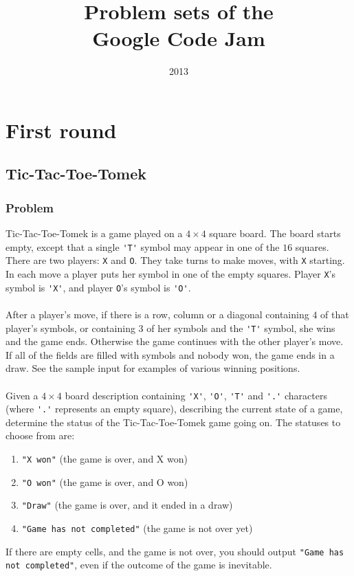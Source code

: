 \documentclass[titlepage]{article}
\title{Problem sets of the\\Google Code Jam}
\author{}
\date{2013}
\begin{document}
\begin{titlepage}
\maketitle
\end{titlepage}
\tableofcontents
\newpage

\section{First round}

\subsection{Tic-Tac-Toe-Tomek}

\subsubsection{Problem}
Tic-Tac-Toe-Tomek is a game played on a $4\times4$ square board. The board starts empty, except that a single \verb+'T'+ symbol may appear in one of the $16$ squares. There are two players: \verb+X+ and \verb+O+. They take turns to make moves, with \verb+X+ starting. In each move a player puts her symbol in one of the empty squares. Player \verb+X+'s symbol is \verb+'X'+, and player \verb+O+'s symbol is \verb+'O'+.
\paragraph{}
After a player's move, if there is a row, column or a diagonal containing $4$ of that player's symbols, or containing $3$ of her symbols and the \verb+'T'+ symbol, she wins and the game ends. Otherwise the game continues with the other player's move. If all of the fields are filled with symbols and nobody won, the game ends in a draw. See the sample input for examples of various winning positions.
\paragraph{}
Given a $4\times4$ board description containing \verb+'X'+, \verb+'O'+, \verb+'T'+ and \verb+'.'+ characters (where \verb+'.'+ represents an empty square), describing the current state of a game, determine the status of the Tic-Tac-Toe-Tomek game going on. The statuses to choose from are:
\begin{enumerate}
 \item \verb+"X won"+ (the game is over, and X won)
 \item \verb+"O won"+ (the game is over, and O won)
 \item \verb+"Draw"+ (the game is over, and it ended in a draw)
 \item \verb+"Game has not completed"+ (the game is not over yet)
\end{enumerate}
If there are empty cells, and the game is not over, you should output \verb+"Game has not completed"+, even if the outcome of the game is inevitable.
\end{document}
